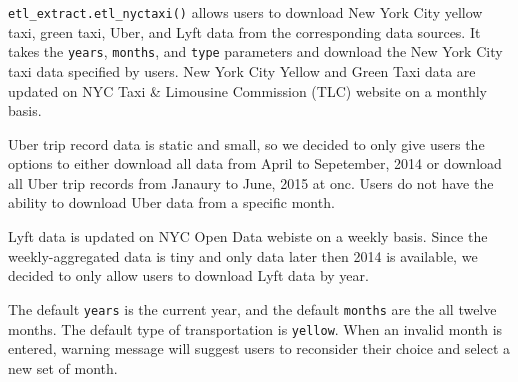 \documentclass[12pt,twoside]{reedthesis}
\newenvironment{Shaded}{\begin{snugshade}}{\end{snugshade}}
\newcommand{\KeywordTok}[1]{\textcolor[rgb]{0.13,0.29,0.53}{\textbf{#1}}}
\newcommand{\DataTypeTok}[1]{\textcolor[rgb]{0.13,0.29,0.53}{#1}}
\newcommand{\DecValTok}[1]{\textcolor[rgb]{0.00,0.00,0.81}{#1}}
\newcommand{\StringTok}[1]{\textcolor[rgb]{0.31,0.60,0.02}{#1}}
\newcommand{\OperatorTok}[1]{\textcolor[rgb]{0.81,0.36,0.00}{\textbf{#1}}}
\newcommand{\NormalTok}[1]{#1}
\theoremstyle{definition}
\theoremstyle{definition}
\theoremstyle{definition}
\theoremstyle{remark}
\begin{document}
\texttt{etl\_extract.etl\_nyctaxi()} allows users to download New York
City yellow taxi, green taxi, Uber, and Lyft data from the corresponding
data sources. It takes the \texttt{years}, \texttt{months}, and
\texttt{type} parameters and download the New York City taxi data
specified by users. New York City Yellow and Green Taxi data are updated
on NYC Taxi \& Limousine Commission (TLC) website on a monthly basis.
\begin{Shaded}
\end{Shaded}
Uber trip record data is static and small, so we decided to only give
users the options to either download all data from April to Sepetember,
2014 or download all Uber trip records from Janaury to June, 2015 at
onc. Users do not have the ability to download Uber data from a specific
month.
\begin{Shaded}
\end{Shaded}
Lyft data is updated on NYC Open Data webiste on a weekly basis. Since
the weekly-aggregated data is tiny and only data later then 2014 is
available, we decided to only allow users to download Lyft data by year.
\begin{Shaded}
\end{Shaded}
The default \texttt{years} is the current year, and the default
\texttt{months} are the all twelve months. The default type of
transportation is \texttt{yellow}. When an invalid month is entered,
warning message will suggest users to reconsider their choice and select
a new set of month.
\end{document}
